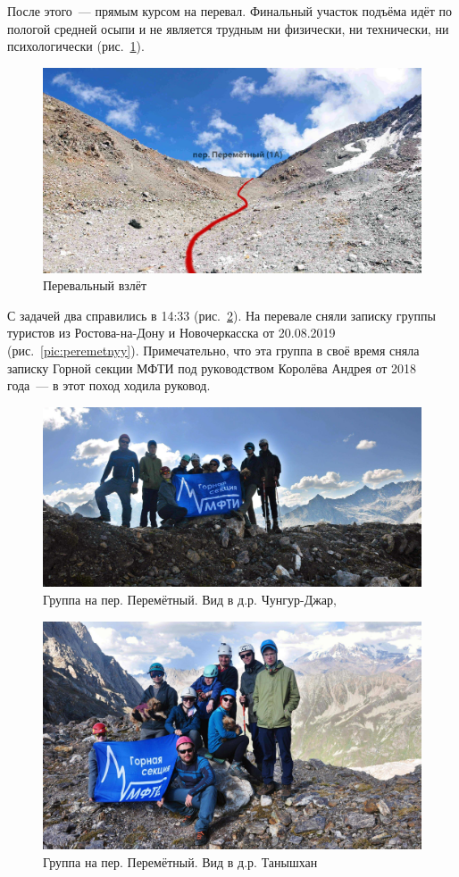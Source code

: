 После этого~--- прямым курсом на перевал. Финальный участок подъёма идёт по пологой средней осыпи и не является трудным ни физически, ни технически, ни психологически (рис.~\ref{fig:DSC_0341}).

\begin{figure}[h!]
	\centering
	\includegraphics[width=0.7\linewidth]{../pics/DSC_0341.jpg}
	\caption{Перевальный взлёт}
	\label{fig:DSC_0341}
\end{figure} 

С задачей два справились в 14:33 (рис.~\ref{fig:DSC_0412}). На перевале сняли записку группы туристов из Ростова-на-Дону и Новочеркасска от 20.08.2019 (рис.~\ref{pic:peremetnyy}). Примечательно, что эта группа в своё время сняла записку Горной секции МФТИ под руководством Королёва Андрея от 2018 года~--- в этот поход ходила руковод.

\begin{figure}[h!]
	\centering
	\includegraphics[width=0.7\linewidth]{../pics/DSC_0412 2.jpg}
	\caption{Группа на пер. Перемётный. Вид в д.р. Чунгур-Джар,}
	\label{fig:DSC_0412}
\end{figure} 


\begin{figure}[h!]
	\centering
	\includegraphics[width=0.7\linewidth]{../pics/DSC_0419 2.jpg}
	\caption{Группа на пер. Перемётный. Вид в д.р. Танышхан}
	\label{fig:DSC_0419}
\end{figure} 


